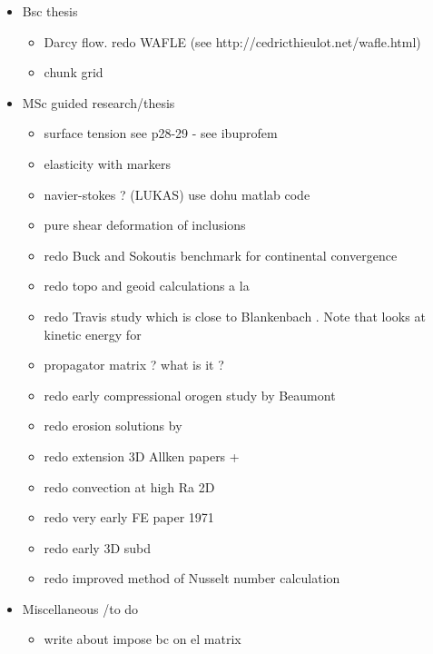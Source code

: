 
\begin{itemize}
\item Bsc thesis
\begin{itemize} 
\item Darcy flow. redo WAFLE (see http://cedricthieulot.net/wafle.html)
\item chunk grid
\end{itemize}
\item MSc guided research/thesis
\begin{itemize} 
\item surface tension see \cite{reddybook2}p28-29 - see ibuprofem 
\item elasticity with markers
\item navier-stokes ? (LUKAS) use dohu matlab code
\item pure shear deformation of inclusions \cite{trla00}
\item redo Buck and Sokoutis benchmark for continental convergence \cite{buso94}
\item redo topo and geoid calculations a la \cite{king09}
\item redo Travis study \cite{trab90} which is close to Blankenbach \cite{blbc89}. Note that \cite{maie12} looks at kinetic energy for \cite{trab90} 
\item propagator matrix ? what is it ? \cite{ribe18} \mscthesis {}  
\Literature \cite{haoc78,haoc81,riha84,zhon96,como97,mohc98,zhzu00,lezh08,leha08,mofm07,mibb09,fope91,lizh13,bugo94} 
\item redo early compressional orogen study by Beaumont \cite{bequ94}
\item redo erosion solutions by \cite{cull60} \mscthesis {} 
\item redo extension 3D Allken papers + \cite{poay84,katl95} 
\item redo convection at high Ra 2D \cite{scan85}
\item redo very early FE paper 1971 \cite{stbe71}
\item redo early 3D subd \cite{zhgu96}
\item redo improved method of Nusselt number calculation \cite{hohr87}
\end{itemize}
\item Miscellaneous /to do
\begin{itemize} 
\item write about impose bc on el matrix

\end{itemize}
\end{itemize}
